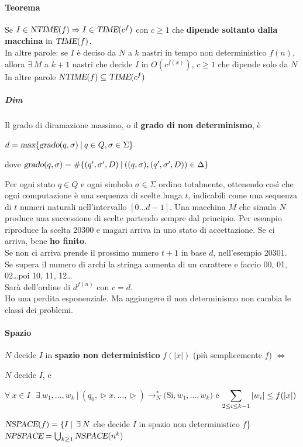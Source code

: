 \documentclass[10pt]{book}
\begin{document}
\paragraph{Teorema} Se $I \in \textsl{NTIME}(f) \Rightarrow I \in \textsl{TIME}(c^f)   $ con $c \geq 1$ che \textbf{dipende soltanto dalla macchina} in $\textsl{TIME}(f)$.\\ In altre parole: se $I$ è deciso da $N$ a $k$ nastri in tempo non deterministico $f(n)$, allora $\exists\:M$ a $k+1$ nastri che decide $I$ in $O(c^{f(x)})$, $c \geq 1$ che dipende solo da $N$\\
In altre parole $\textsl{NTIME}(f) \subseteq \textsl{TIME}(c^f)$
\subparagraph{Dim} Il grado di diramazione massimo, o il \textbf{grado di non determinismo}, è 
\begin{list}{}{}
	\item $d = \textsl{max}\{\textsl{grado}(q, \sigma)\:|\:q\in Q, \sigma \in \Sigma\}$
	\item dove $\textsl{grado}(q, \sigma) = \#\{(q', \sigma', D)\:|\:((q, \sigma), (q', \sigma', D))\in \Delta \}$
\end{list}
Per ogni stato $q \in Q$ e ogni simbolo $\sigma \in \Sigma$ ordino totalmente, ottenendo così che ogni computazione è una sequenza di scelte lunga $t$, indicabili come una sequenza di $t$ numeri naturali nell'intervallo $[0\ldots d-1]$. Una macchina $M$ che simula $N$ produce una successione di scelte partendo sempre dal principio. Per esempio riproduce la scelta 20300 e magari arriva in uno stato di accettazione. Se ci arriva, bene \textbf{ho finito}.\\
Se non ci arriva prende il prossimo numero $t+1$ in base $d$, nell'esempio 20301.\\
Se supera il numero di archi la stringa aumenta di un carattere e faccio 00, 01, 02\ldots poi 10, 11, 12\ldots\\
Sarà dell'ordine di $d^{f(n)}$ con $c = d$.\\
Ho una perdita esponenziale. Ma aggiungere il non determinismo non cambia le classi dei problemi.
\paragraph{Spazio} $N$ decide $I$ in \textbf{spazio non deterministico} $f(|x|)$ (più semplicemente $f$) $\Leftrightarrow$
\begin{list}{}{}
	\item $N$ decide $I$, e
	\item $\forall\: x \in I\:\:\:\exists\:w_1,\ldots, w_k\:|\:(q_0, \underline{\triangleright}x,\ldots,\underline{\triangleright})\rightarrow_N^*($Si$, w_1, \ldots, w_k)$ e $\mathlarger{\sum_{2\leq i \leq k-1}|w_i| \leq f(|x|)}$
\end{list}
$\textsl{NSPACE}(f) = \{I\:|\:\:\exists\:N$ che decide $I$ in spazio non deterministico $f$\}\\
$\textsl{NPSPACE} = \bigcup_{k\geq 1}\textsl{NSPACE}(n^k)$
\end{document}
